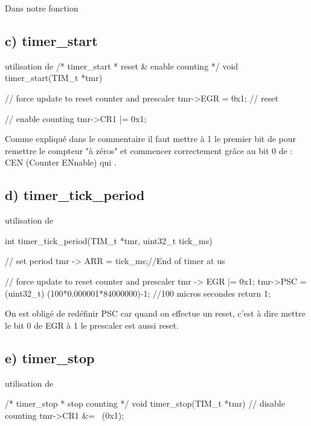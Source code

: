 Dans notre fonction 


\subsection{c) timer\_start}

\begin{Cpp}{utilisation de } 
/* timer_start
 *   reset & enable counting
 */
void timer_start(TIM_t *tmr)
{
	// force update to reset counter and prescaler
	tmr->EGR = 0x1;		// reset
	
	// enable counting
	tmr->CR1 |= 0x1; 	
}
\end{Cpp}

Comme expliqué dans le commentaire il faut mettre à 1 le premier bit de  pour remettre le compteur "à zéros" et commencer correctement grâce au bit 0 de  : CEN (Counter ENnable) qui .\\

\subsection{d) timer\_tick\_period}

\begin{Cpp}{utilisation de } 

int timer_tick_period(TIM_t *tmr, uint32_t tick_ms)
{
    // set period
	tmr -> ARR = tick_ms;//End of timer at us  
    
    // force update to reset counter and prescaler
	tmr -> EGR |= 0x1;
	tmr->PSC = (uint32_t) (100*0.000001*84000000)-1; //100 micros secondes
	return 1;
}

\end{Cpp}

On est obligé de redéfinir PSC car quand on effectue un reset, c'est à dire mettre le bit 0 de EGR à 1 le prescaler est aussi reset.

\newpage
\subsection{e) timer\_stop}

\begin{Cpp}{utilisation de } 

/* timer_stop
 *   stop counting
 */
void timer_stop(TIM_t *tmr)
{
	// disable counting
	tmr->CR1 &= ~(0x1);
}

\end{Cpp}


